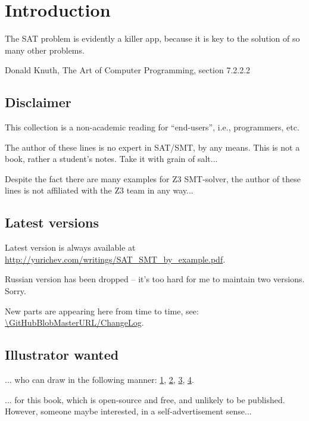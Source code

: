 \section{Introduction}

\epigraph{The SAT problem is evidently a killer app, because it is key to the solution of so many other problems.}
{Donald Knuth, The Art of Computer Programming, section 7.2.2.2}

\subsection{Disclaimer}

This collection is a non-academic reading for ``end-users'', i.e., programmers, etc.

The author of these lines is no expert in SAT/SMT, by any means.
This is not a book, rather a student's notes.
Take it with grain of salt...

Despite the fact there are many examples for Z3 SMT-solver,
the author of these lines is not affiliated with the Z3 team in any way...

\subsection{Latest versions}

Latest version is always available at \url{http://yurichev.com/writings/SAT_SMT_by_example.pdf}.

Russian version has been dropped -- it's too hard for me to maintain two versions. Sorry.

New parts are appearing here from time to time, see: \url{\GitHubBlobMasterURL/ChangeLog}.

\iffalse
\subsection{Illustrator wanted}

... who can draw in the following manner:
\href{https://github.com/DennisYurichev/RE-for-beginners/blob/master/cover.jpg}{1},
\href{https://github.com/DennisYurichev/RE-for-beginners/blob/master/cover2.jpg}{2},
\href{https://github.com/DennisYurichev/RE-for-beginners/blob/master/cover3.jpg}{3},
\href{https://github.com/DennisYurichev/RE-for-beginners/blob/master/cover4.jpg}{4}.

... for this book, which is open-source and free, and unlikely to be published.
However, someone maybe interested, in a self-advertisement sense...

